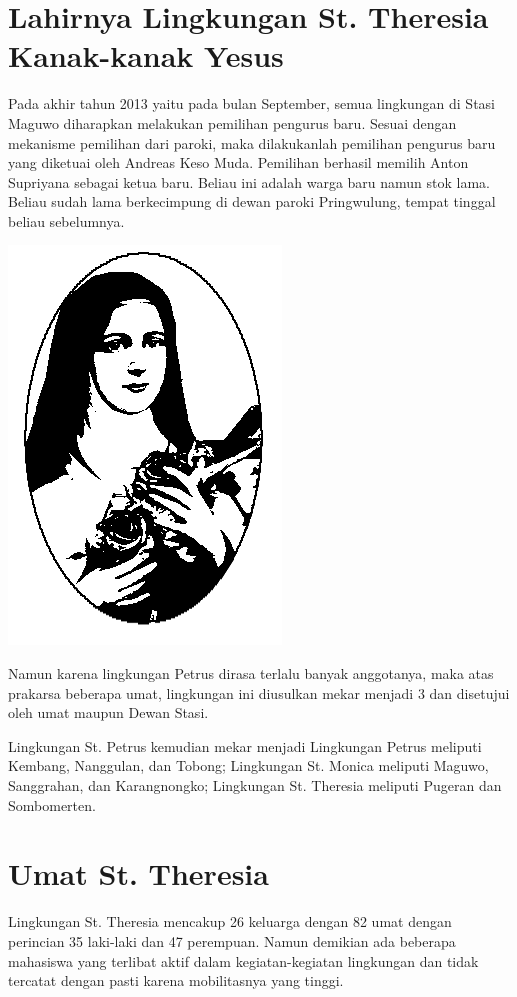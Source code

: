 \section{Lahirnya Lingkungan St. Theresia Kanak-kanak Yesus}
Pada akhir tahun 2013 yaitu pada bulan September, semua lingkungan di Stasi Maguwo 
diharapkan melakukan pemilihan pengurus baru. Sesuai dengan mekanisme pemilihan dari paroki, 
maka dilakukanlah pemilihan pengurus baru yang diketuai oleh Andreas Keso Muda.
Pemilihan berhasil memilih Anton Supriyana sebagai ketua baru. Beliau ini adalah warga baru namun stok lama. Beliau sudah lama berkecimpung di dewan paroki Pringwulung, tempat tinggal beliau sebelumnya.

\begin{floatingfigure}[l]{2cm}
	\begin{center}
		\includegraphics[scale=1]{theresia-logo.png}
	\end{center}
\end{floatingfigure}
Namun karena lingkungan Petrus dirasa terlalu banyak anggotanya, maka atas prakarsa beberapa umat, lingkungan ini diusulkan mekar menjadi 3 dan disetujui oleh umat maupun Dewan Stasi. 

Lingkungan St. Petrus kemudian mekar menjadi Lingkungan Petrus meliputi Kembang, Nanggulan, dan Tobong; Lingkungan St. Monica meliputi Maguwo, Sanggrahan, dan Karangnongko; Lingkungan St. Theresia meliputi Pugeran dan Sombomerten. 


\vspace{0.5cm}


\section{Umat St. Theresia}
Lingkungan St. Theresia mencakup 26 keluarga dengan 82 umat dengan perincian 35 laki-laki dan 47 perempuan. Namun demikian ada beberapa mahasiswa yang terlibat aktif dalam kegiatan-kegiatan lingkungan dan tidak tercatat dengan pasti karena mobilitasnya yang tinggi.

